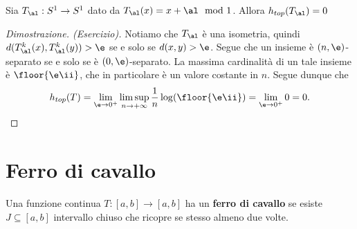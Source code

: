 
\begin{proposition}
Sia $T_\al:S^1\to S^1$ dato da $T_\al(x)=x+\al\mod 1$. Allora $h_{top}(T_\al)=0$
\end{proposition}
\begin{proof}[Dimostrazione. (Esercizio)]
Notiamo che $T_\al$ \`e una isometria, quindi $d(T_\al^k(x),T^k_\al(y))>\e$ se e solo se $d(x,y)>\e$. Segue che un insieme \`e $(n,\e)$-separato se e solo se \`e $(0,\e)$-separato. La massima cardinalit\`a di un tale insieme \`e $\floor{\e\ii}$, che in particolare \`e un valore costante in $n$. Segue dunque che
\[h_{top}(T)=\lim_{\e\to0^+}\limsup_{n\to+\infty}\frac1n\log(\floor{\e\ii})=\lim_{\e\to0^+}0=0.\]
\end{proof}

\section{Ferro di cavallo}
\begin{definition}
Una funzione continua $T:[a,b]\to[a,b]$ ha un \textbf{ferro di cavallo} se esiste $J\subseteq [a,b]$ intervallo chiuso che ricopre se stesso almeno due volte.
\end{definition}

